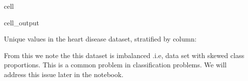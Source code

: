 \documentclass[letterpaper,10pt,english]{jupyterBook}
\begin{document}
\begin{sphinxuseclass}{cell}
\begin{sphinxVerbatimOutput}
\begin{sphinxuseclass}{cell_output}
\begin{sphinxVerbatim}[commandchars=\\\{\}]
Unique values in the heart disease dataset, stratified by column:
\PYGZhy{}\PYGZhy{}\PYGZhy{}\PYGZhy{}\PYGZhy{}\PYGZhy{}\PYGZhy{}\PYGZhy{}\PYGZhy{}\PYGZhy{}\PYGZhy{}\PYGZhy{}\PYGZhy{}\PYGZhy{}\PYGZhy{}\PYGZhy{}\PYGZhy{}\PYGZhy{}\PYGZhy{}\PYGZhy{}\PYGZhy{}\PYGZhy{}\PYGZhy{}\PYGZhy{}\PYGZhy{}\PYGZhy{}\PYGZhy{}\PYGZhy{}\PYGZhy{}\PYGZhy{}\PYGZhy{}\PYGZhy{}\PYGZhy{}\PYGZhy{}\PYGZhy{}\PYGZhy{}\PYGZhy{}\PYGZhy{}\PYGZhy{}\PYGZhy{}\PYGZhy{}\PYGZhy{}\PYGZhy{}\PYGZhy{}\PYGZhy{}\PYGZhy{}\PYGZhy{}\PYGZhy{}\PYGZhy{}\PYGZhy{}\PYGZhy{}\PYGZhy{}\PYGZhy{}\PYGZhy{}\PYGZhy{}\PYGZhy{}\PYGZhy{}\PYGZhy{}\PYGZhy{}\PYGZhy{}\PYGZhy{}\PYGZhy{}\PYGZhy{}\PYGZhy{}\PYGZhy{}
\end{sphinxVerbatim}

\noindent{}

\noindent{}

\noindent{}

\noindent{}

\noindent{}

\noindent{}

\noindent{}

\noindent{}

\noindent{}

\noindent{}

\end{sphinxuseclass}\end{sphinxVerbatimOutput}

\end{sphinxuseclass}
\sphinxAtStartPar
From this we note the this dataset is imbalanced .i.e, data set with skewed class proportions. This is a common problem in classification problems. We will address this issue later in the notebook.
\end{document}
